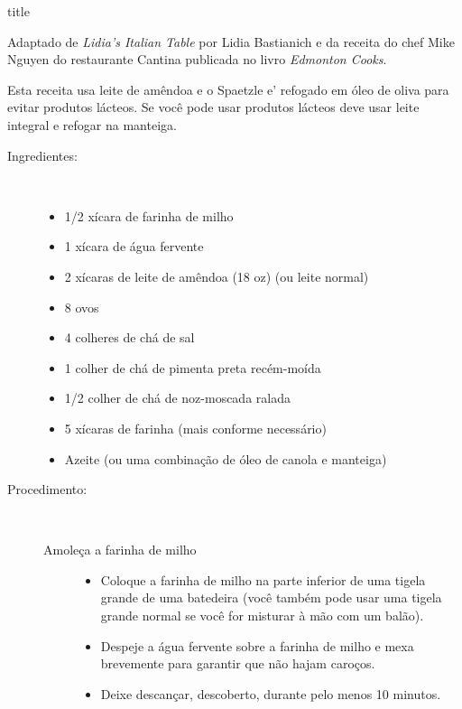 \documentclass [11pt, letterpaper] {article}
\begin{document}
 {title}

\begin {flushright}
Adaptado de {\it Lidia's Italian Table} por Lidia Bastianich e da receita do chef Mike Nguyen do restaurante Cantina publicada no livro {\it Edmonton Cooks}. 
\end {flushright}

Esta receita usa leite de am\^endoa e o Spaetzle e' refogado em \'oleo de oliva para evitar produtos l\'acteos. Se voc\^e pode usar produtos l\'acteos deve usar leite integral e refogar na manteiga.

\vspace {0.3in}
\begin {description}

\item [Ingredientes:] \ \\
\begin {itemize}
\item 1/2 xícara de farinha de milho
\item 1 xícara de água fervente
\item 2 xícaras de leite de amêndoa (18 oz) (ou leite normal)
\item 8 ovos
\item 4 colheres de chá de sal
\item 1 colher de chá de pimenta preta recém-moída
\item 1/2 colher de chá de noz-moscada ralada
\item 5 xícaras de farinha (mais conforme necessário)
\item Azeite (ou uma combinação de óleo de canola e manteiga)
\end {itemize}


\item [Procedimento:] \ \\
\begin {description}
\item [Amole\c{c}a a farinha de milho] 
\begin {itemize}
\item Coloque a farinha de milho na parte inferior de uma tigela grande de uma batedeira (você também pode usar uma tigela grande normal se você for misturar à mão com um balão).
\item Despeje a água fervente sobre a farinha de milho e mexa brevemente para garantir que não hajam caro\c{c}os.
\item Deixe descan\c{c}ar, descoberto, durante pelo menos 10 minutos.
\end {itemize}


\end{description}
\end{description}
\end{document}
